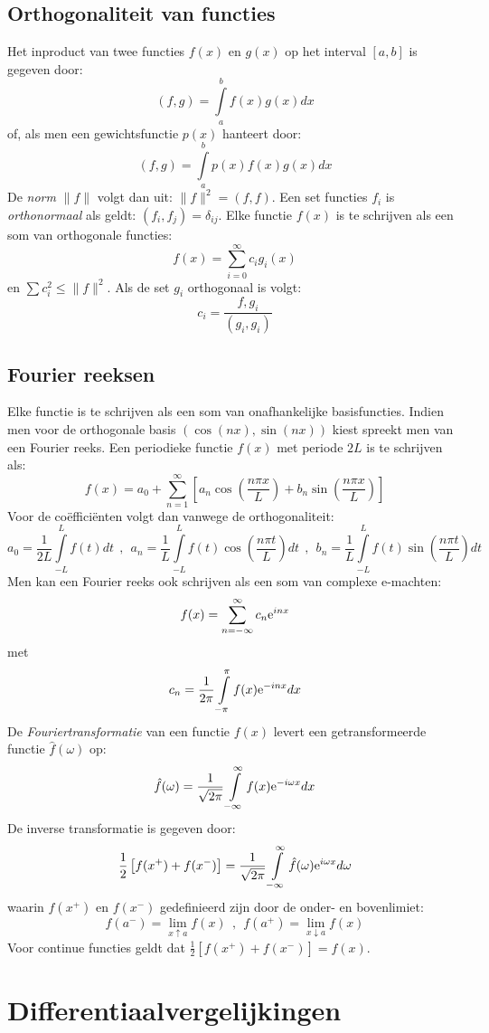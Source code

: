 \documentclass[twoside]{report}
\begin{document}
\section{Orthogonaliteit van functies}
Het inproduct van twee functies $f(x)$ en $g(x)$ op het interval $[a,b]$ is
gegeven door:
\[
(f,g)=\int\limits_a^bf(x)g(x)dx
\]
of, als men een gewichtsfunctie $p(x)$ hanteert door:
\[
(f,g)=\int\limits_a^bp(x)f(x)g(x)dx
\]
De {\it norm} $\|f\|$ volgt dan uit: $\|f\|^2=(f,f)$. Een set functies $f_i$
is {\it orthonormaal} als geldt: $(f_i,f_j)=\delta_{ij}$.
\npar
Elke functie $f(x)$ is te schrijven als een som van orthogonale functies:
\[
f(x)=\sum_{i=0}^\infty c_ig_i(x)
\]
en $\sum c_i^2\leq\|f\|^2$. Als de set $g_i$ orthogonaal is volgt:
\[
c_i=\frac{f,g_i}{(g_i,g_i)}
\]

\section{Fourier reeksen}
Elke functie is te schrijven als een som van onafhankelijke basisfuncties.
Indien men voor de orthogonale basis $(\cos(nx),\sin(nx))$ kiest spreekt men
van een Fourier reeks.
\npar
Een periodieke functie $f(x)$ met periode $2L$ is te schrijven als:
\[
f(x)=a_0+\sum_{n=1}^\infty\left[a_n\cos\left(\frac{n\pi x}{L}\right)+b_n\sin\left(\frac{n\pi x}{L}\right)\right]
\]
Voor de co\"effici\"enten volgt dan vanwege de orthogonaliteit:
\[
a_0=\frac{1}{2L}\int\limits_{-L}^Lf(t)dt~~,~~
a_n=\frac{1}{L}\int\limits_{-L}^Lf(t)\cos\left(\frac{n\pi t}{L}\right)dt~~,~~
b_n=\frac{1}{L}\int\limits_{-L}^Lf(t)\sin\left(\frac{n\pi t}{L}\right)dt
\]
Men kan een Fourier reeks ook schrijven als een som van complexe e-machten:
\[
f(x)=\sum_{n=-\infty}^\infty c_n{\rm e}^{inx}
\]
met
\[
c_n=\frac{1}{2\pi}\int\limits_{-\pi}^\pi f(x){\rm e}^{-inx}dx
\]
De {\it Fouriertransformatie} van een functie $f(x)$ levert een
getransformeerde functie $\hat{f}(\omega)$ op:
\[
\hat{f}(\omega)=\frac{1}{\sqrt{2\pi}}\int\limits_{-\infty}^\infty f(x){\rm e}^{-i\omega x}dx
\]
De inverse transformatie is gegeven door:
\[
\frac{1}{2}\left[f(x^+)+f(x^-)\right]=\frac{1}{\sqrt{2\pi}}\int\limits_{-\infty}^\infty\hat{f}(\omega){\rm e}^{i\omega x}d\omega
\]
waarin $f(x^+)$ en $f(x^-)$ gedefinieerd zijn door de onder- en bovenlimiet:
\[
f(a^-)=\lim_{x\uparrow a}f(x)~~,~~f(a^+)=\lim_{x\downarrow a}f(x)
\]
Voor continue functies geldt dat $\frac{1}{2}\left[f(x^+)+f(x^-)\right]=f(x)$.

\chapter{Differentiaalvergelijkingen}
\end{document}
